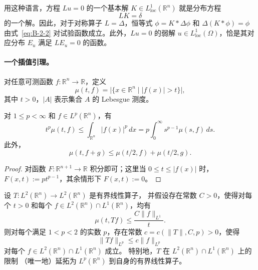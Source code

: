 用这种语言，方程 $Lu=0$ 的一个基本解
$K\in L^1_{\mathrm{loc}}(\mathbb R^n)$ 就是分布方程
\[
  LK=\delta
\]
的一个解。因此，对于对称算子 $L=\Delta$，恒等式
$\phi=K*\Delta\phi$ 和 $\Delta(K*\phi)=\phi$
由式~\eqref{eq:B-2-2} 对试验函数成立。此外，$Lu=0$ 的弱解
$u\in L^1_{\mathrm{loc}}(\Omega)$，恰是其对应分布 $E_u$ 满足
$LE_u=0$ 的函数。

\paragraph{一个插值引理。}
对任意可测函数 $f:\mathbb R^n\to\mathbb R$，定义
\[
  \mu(t,f)=\bigl|\{x\in\mathbb R^n\mid |f(x)|>t\}\bigr|,
\]
其中 $t>0$，$|A|$ 表示集合 $A$ 的 Lebesgue 测度。

\begin{lemma}\label{lem:B-2-4}
对 $1\le p<\infty$ 和 $f\in L^p(\mathbb R^n)$，有
\[
  t^p\mu(t,f)\le\int_{\mathbb R^n}|f(x)|^p\,dx
  =p\int_0^\infty s^{p-1}\mu(s,f)\,ds.
\]
此外，
\[
  \mu(t,f+g)\le\mu(t/2,f)+\mu(t/2,g).
\]
\end{lemma}

\begin{proof}
对函数 $F:\mathbb R^{n+1}\to\mathbb R$ 积分即可；这里当
$0\le t\le|f(x)|$ 时，$F(x,t):=pt^{p-1}$，其余情形下 $F(x,t):=0$。
\end{proof}

\begin{lemma}[Marcinkiewicz]\label{lem:B-2-5}
设 $T:L^2(\mathbb R^n)\to L^2(\mathbb R^n)$ 是有界线性算子，
并假设存在常数 $C>0$，使得对每个 $t>0$ 和每个
$f\in L^2(\mathbb R^n)\cap L^1(\mathbb R^n)$，均有
\[
  \mu(t,Tf)\le\frac{C\|f\|_{L^1}}{t}.
\]
则对每个满足 $1<p<2$ 的实数 $p$，存在常数
$c=c(\|T\|,C,p)>0$，使得
\[
  \|Tf\|_{L^p}\le c\|f\|_{L^p}
\]
对每个 $f\in L^2(\mathbb R^n)\cap L^1(\mathbb R^n)$ 成立。
特别地，$T$ 在 $L^2(\mathbb R^n)\cap L^1(\mathbb R^n)$ 上的限制
（唯一地）延拓为 $L^p(\mathbb R^n)$ 到自身的有界线性算子。
\end{lemma}

